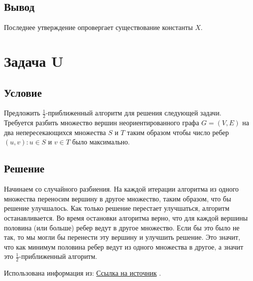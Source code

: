 \documentclass{article}
\begin{document}
\subsection*{Вывод} Последнее утверждение опровергает существование константы $X$.

\newpage
\section*{Задача  U} 

\subsection*{Условие} 
Предложить $\frac{1}{2}$-приближенный алгоритм для решения следующей задачи. Требуется разбить множество вершин неориентированного графа $G=(V,E)$ на два непересекающихся множества $S$ и $T$ таким образом чтобы число ребер $(u,v): u \in S$ и $v \in T$ было максимально.

\subsection*{Решение} 
Начинаем со случайного разбиения. На каждой итерации алгоритма из одного множества переносим вершину в другое множество, таким образом, что бы решение улучшалось. Как только решение перестает улучшаться, алгоритм останавливается. Во время остановки алгоритма верно, что для каждой вершины половина (или больше) ребер ведут в другое множество. Если бы это было не так, то мы могли бы перенести эту вершину и улучшить решение. Это значит, что как минимум половина ребер ведут из одного множества в другое, а значит это $\frac{1}{2}$-приближенный алгоритм.

Использована информация из: \href{https://ru.wikipedia.org/wiki/Максимальный_разрез_графа#CITEREFMitzenmacher,_Upfal2005}{Ссылка на источник} .
\end{document}

